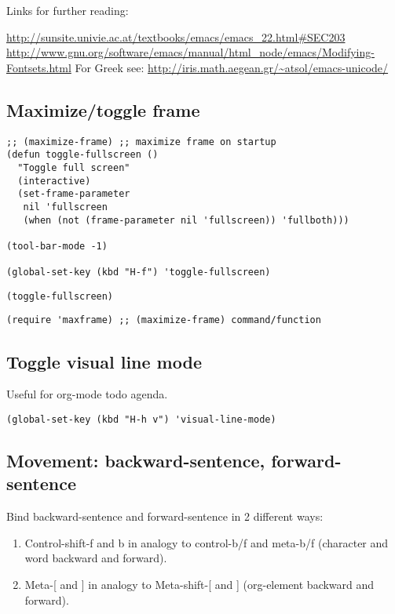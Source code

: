\documentclass[nofonts]{tufte-handout}
\begin{document}
Links for further reading:

\url{http://sunsite.univie.ac.at/textbooks/emacs/emacs_22.html#SEC203}
\url{http://www.gnu.org/software/emacs/manual/html_node/emacs/Modifying-Fontsets.html}
For Greek see: \url{http://iris.math.aegean.gr/~atsol/emacs-unicode/}

\subsection{Maximize/toggle frame}
\label{sec-1-7}
\begin{verbatim}
;; (maximize-frame) ;; maximize frame on startup
(defun toggle-fullscreen ()
  "Toggle full screen"
  (interactive)
  (set-frame-parameter
   nil 'fullscreen
   (when (not (frame-parameter nil 'fullscreen)) 'fullboth)))

(tool-bar-mode -1)

(global-set-key (kbd "H-f") 'toggle-fullscreen)
\end{verbatim}

\begin{verbatim}
(toggle-fullscreen)
\end{verbatim}

\begin{verbatim}
(require 'maxframe) ;; (maximize-frame) command/function
\end{verbatim}
\subsection{Toggle visual line mode}
\label{sec-1-8}

Useful for org-mode todo agenda.

\begin{verbatim}
(global-set-key (kbd "H-h v") 'visual-line-mode)
\end{verbatim}
\subsection{Movement: backward-sentence, forward-sentence}
\label{sec-1-9}

Bind backward-sentence and forward-sentence in 2 different ways:

\begin{enumerate}
\item Control-shift-f and b in analogy to control-b/f and meta-b/f (character and word backward and forward).
\item Meta-[ and ] in analogy to Meta-shift-[ and ] (org-element backward and forward).
\end{enumerate}
\end{document}
